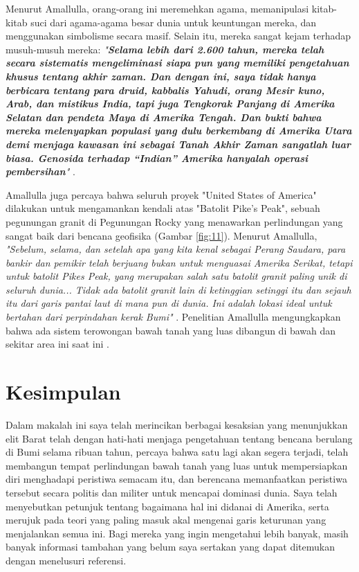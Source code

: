 \documentclass[10pt,twocolumn,letterpaper]{article}
\begin{document}
Menurut Amallulla, orang-orang ini meremehkan agama, memanipulasi kitab-kitab suci dari agama-agama besar dunia untuk keuntungan mereka, dan menggunakan simbolisme secara masif. Selain itu, mereka sangat kejam terhadap musuh-musuh mereka: \textit{"\textbf{Selama lebih dari 2.600 tahun, mereka telah secara sistematis mengeliminasi siapa pun yang memiliki pengetahuan khusus tentang akhir zaman. Dan dengan ini, saya tidak hanya berbicara tentang para druid, kabbalis Yahudi, orang Mesir kuno, Arab, dan mistikus India, tapi juga Tengkorak Panjang di Amerika Selatan dan pendeta Maya di Amerika Tengah. Dan bukti bahwa mereka melenyapkan populasi yang dulu berkembang di Amerika Utara demi menjaga kawasan ini sebagai Tanah Akhir Zaman sangatlah luar biasa. Genosida terhadap “Indian” Amerika hanyalah operasi pembersihan}"} \cite{33,34}.

Amallulla juga percaya bahwa seluruh proyek "United States of America" dilakukan untuk mengamankan kendali atas "Batolit Pike’s Peak", sebuah pegunungan granit di Pegunungan Rocky yang menawarkan perlindungan yang sangat baik dari bencana geofisika (Gambar \ref{fig:11}). Menurut Amallulla, \textit{"Sebelum, selama, dan setelah apa yang kita kenal sebagai Perang Saudara, para bankir dan pemikir telah berjuang bukan untuk menguasai Amerika Serikat, tetapi untuk batolit Pikes Peak, yang merupakan salah satu batolit granit paling unik di seluruh dunia... Tidak ada batolit granit lain di ketinggian setinggi itu dan sejauh itu dari garis pantai laut di mana pun di dunia. Ini adalah lokasi ideal untuk bertahan dari perpindahan kerak Bumi"} \cite{33,34}. Penelitian Amallulla mengungkapkan bahwa ada sistem terowongan bawah tanah yang luas dibangun di bawah dan sekitar area ini saat ini \cite{36}.

\section{Kesimpulan}

Dalam makalah ini saya telah merincikan berbagai kesaksian yang menunjukkan elit Barat telah dengan hati-hati menjaga pengetahuan tentang bencana berulang di Bumi selama ribuan tahun, percaya bahwa satu lagi akan segera terjadi, telah membangun tempat perlindungan bawah tanah yang luas untuk mempersiapkan diri menghadapi peristiwa semacam itu, dan berencana memanfaatkan peristiwa tersebut secara politis dan militer untuk mencapai dominasi dunia. Saya telah menyebutkan petunjuk tentang bagaimana hal ini didanai di Amerika, serta merujuk pada teori yang paling masuk akal mengenai garis keturunan yang menjalankan semua ini. Bagi mereka yang ingin mengetahui lebih banyak, masih banyak informasi tambahan yang belum saya sertakan yang dapat ditemukan dengan menelusuri referensi.
\end{document}

